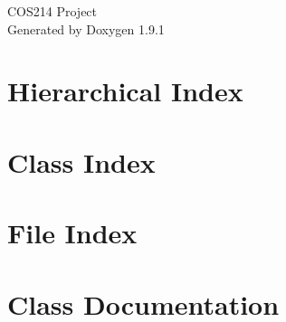 \let\mypdfximage\pdfximage\def\pdfximage{\immediate\mypdfximage}\documentclass[twoside]{book}
\newcommand{\+}{\discretionary{\mbox{\scriptsize$\hookleftarrow$}}{}{}}
\newcommand{\clearemptydoublepage}{%
  \newpage{\pagestyle{empty}\cleardoublepage}%
}
\begin{document}
\raggedbottom

\hypersetup{pageanchor=false,
             bookmarksnumbered=true,
             pdfencoding=unicode
            }
\begin{titlepage}
\vspace*{7cm}
\begin{center}%
{\Large COS214 Project }\\
\vspace*{1cm}
{\large Generated by Doxygen 1.9.1}\\
\end{center}
\end{titlepage}
\clearemptydoublepage
{}
\tableofcontents
\clearemptydoublepage
{}
\hypersetup{pageanchor=true}

\chapter{Hierarchical Index}

\chapter{Class Index}

\chapter{File Index}

\chapter{Class Documentation}








































\end{document}
